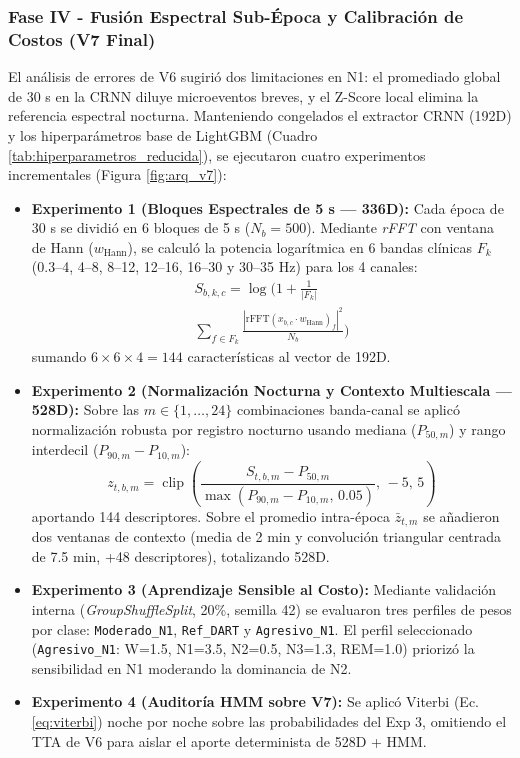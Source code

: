 \documentclass[conference]{IEEEtran}
\begin{document}
\subsubsection{Fase IV - Fusión Espectral Sub-Época y Calibración de Costos (V7 Final)}
El análisis de errores de V6 sugirió dos limitaciones en N1: el promediado global de 30 s en la CRNN diluye microeventos breves, y el Z-Score local elimina la referencia espectral nocturna. Manteniendo congelados el extractor CRNN (192D) y los hiperparámetros base de LightGBM (Cuadro \ref{tab:hiperparametros_reducida}), se ejecutaron cuatro experimentos incrementales (Figura \ref{fig:arq_v7}):
\begin{itemize}
    \item \textbf{Experimento 1 (Bloques Espectrales de 5 s --- 336D):} Cada época de 30 s se dividió en 6 bloques de 5 s ($N_b = 500$). Mediante \textit{rFFT} con ventana de Hann ($w_{\text{Hann}}$), se calculó la potencia logarítmica en 6 bandas clínicas $F_k$ (0.3--4, 4--8, 8--12, 12--16, 16--30 y 30--35 Hz) para los 4 canales:
    \begin{multline}
    S_{b,k,c} = \log\!\Bigg(1 + \frac{1}{|F_k|} \\
    \sum_{f \in F_k} \frac{\left|\text{rFFT}(x_{b,c} \cdot w_{\text{Hann}})_f\right|^2}{N_b}\Bigg)
    \label{eq:rfft_power}
    \end{multline}
    sumando $6 \times 6 \times 4 = 144$ características al vector de 192D.
    \item \textbf{Experimento 2 (Normalización Nocturna y Contexto Multiescala --- 528D):} Sobre las $m \in \{1,\dots,24\}$ combinaciones banda-canal se aplicó normalización robusta por registro nocturno usando mediana ($P_{50,m}$) y rango interdecil ($P_{90,m} - P_{10,m}$):
    \begin{equation}
    z_{t,b,m} = \operatorname{clip}\!\left(\frac{S_{t,b,m} - P_{50,m}}{\max(P_{90,m} - P_{10,m},\, 0.05)},\, -5,\, 5\right)
    \label{eq:robust_norm}
    \end{equation}
    aportando 144 descriptores. Sobre el promedio intra-época $\bar{z}_{t,m}$ se añadieron dos ventanas de contexto (media de 2 min y convolución triangular centrada de 7.5 min, +48 descriptores), totalizando 528D.
    \item \textbf{Experimento 3 (Aprendizaje Sensible al Costo):} Mediante validación interna (\textit{GroupShuffleSplit}, 20\%, semilla 42) se evaluaron tres perfiles de pesos por clase: \texttt{Moderado\_N1}, \texttt{Ref\_DART} y \texttt{Agresivo\_N1}. El perfil seleccionado (\texttt{Agresivo\_N1}: W=1.5, N1=3.5, N2=0.5, N3=1.3, REM=1.0) priorizó la sensibilidad en N1 moderando la dominancia de N2.
    \item \textbf{Experimento 4 (Auditoría HMM sobre V7):} Se aplicó Viterbi (Ec. \eqref{eq:viterbi}) noche por noche sobre las probabilidades del Exp 3, omitiendo el TTA de V6 para aislar el aporte determinista de 528D + HMM.
\end{itemize}
\end{document}
